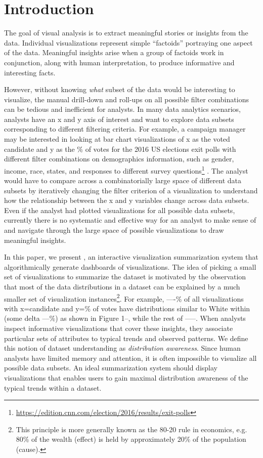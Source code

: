 \section{Introduction}
\par The goal of visual analysis is to extract meaningful stories or insights from the data. Individual visualizations represent simple ``factoids'' portraying one aspect of the data. Meaningful insights arise when a group of factoids work in conjunction, along with human interpretation, to produce informative and interesting facts. 
\par However, without knowing \textit{what} subset of the data would be interesting to visualize, the manual drill-down and roll-ups on all possible filter combinations can be tedious and inefficient for analysts. In many data analytics scenarios, analysts have an x and y axis of interest and want to explore data subsets corresponding to different filtering criteria. For example, a campaign manager may be interested in looking at bar chart visualizations of x as the voted candidate and y as the \% of votes for the 2016 US elections exit polls with different filter combinations on demographics information, such as gender, income, race, states, and responses to different survey questions\footnote{\url{https://edition.cnn.com/election/2016/results/exit-polls}} . The analyst would have to compare across a combinatorially large space of different data subsets by iteratively changing the filter criterion of a visualization to understand how the relationship between the x and y variables change across data subsets. Even if the analyst had plotted visualizations for all possible data subsets, currently there is no systematic and effective way for an analyst to make sense of and navigate through the large space of possible visualizations to draw meaningful insights. 
\par In this paper, we present \system, an interactive visualization summarization system that algorithmically generate dashboards of visualizations. The idea of picking a small set of visualizations to summarize the dataset is motivated by the observation that most of the data distributions in a dataset can be explained by a much smaller set of visualization instances\footnote{This principle is more generally known as the 80-20 rule in economics, e.g. 80\% of the wealth (effect) is held by approximately 20\% of the population (cause).}. For example, ----\% of all visualizations with x=candidate and y=\% of votes have distributions similar to White within (some delta ---\%) as shown in Figure 1--, while the rest of -----. When analysts inspect informative visualizations that cover these insights, they associate particular sets of attributes to typical trends and observed patterns. We define this notion of dataset understanding as \emph{distribution awareness}. Since human analysts have limited memory and attention, it is often impossible to visualize all possible data subsets. An ideal summarization system should display visualizations that enables users to gain maximal distribution awareness of the typical trends within a dataset. 
